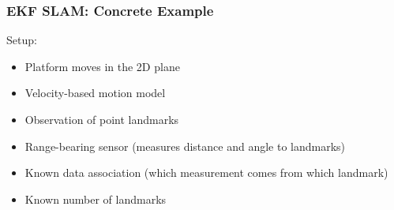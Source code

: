 \begin{frame}
    \frametitle{EKF SLAM: Concrete Example}

    Setup:
    \begin{itemize}
        \item Platform moves in the 2D plane
        \item Velocity-based motion model
        \item Observation of point landmarks
        \item Range-bearing sensor (measures distance and angle to landmarks)
        \item Known data association (which measurement comes from which landmark)
        \item Known number of landmarks
    \end{itemize}
\end{frame}

